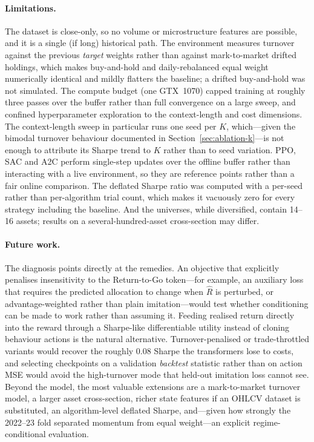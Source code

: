 \documentclass[11pt]{article}
\begin{document}
\paragraph{Limitations.}
The dataset is close-only, so no volume or microstructure features are possible, and it is a
single (if long) historical path. The environment measures turnover against the previous
\emph{target} weights rather than against mark-to-market drifted holdings, which makes
buy-and-hold and daily-rebalanced equal weight numerically identical and mildly flatters the
baseline; a drifted buy-and-hold was not simulated. The compute budget (one GTX~1070) capped
training at roughly three passes over the buffer rather than full convergence on a large
sweep, and confined hyperparameter exploration to the context-length and cost dimensions.
The context-length sweep in particular runs one seed per $K$, which---given the bimodal turnover
behaviour documented in Section~\ref{sec:ablation-k}---is not enough to attribute its Sharpe
trend to $K$ rather than to seed variation.
PPO, SAC and A2C perform single-step updates over the offline buffer rather than interacting
with a live environment, so they are reference points rather than a fair online comparison.
The deflated Sharpe ratio was computed with a per-seed rather than per-algorithm trial count,
which makes it vacuously zero for every strategy including the baseline. And the universes,
while diversified, contain 14--16 assets; results on a several-hundred-asset cross-section may
differ.

\paragraph{Future work.}
The diagnosis points directly at the remedies. An objective that explicitly penalises
insensitivity to the Return-to-Go token---for example, an auxiliary loss that requires the
predicted allocation to change when $\hat{R}$ is perturbed, or advantage-weighted rather than
plain imitation---would test whether conditioning can be made to work rather than assuming it.
Feeding realised return directly into the reward through a Sharpe-like differentiable utility
\cite{moody2001learning,kisiel2022portfolio} instead of cloning behaviour actions is
the natural alternative.
Turnover-penalised or trade-throttled variants would recover the roughly $0.08$ Sharpe the
transformers lose to costs, and selecting checkpoints on a validation \emph{backtest}
statistic rather than on action MSE would avoid the high-turnover mode that held-out imitation
loss cannot see. Beyond the model, the most valuable extensions are a
mark-to-market turnover model, a larger asset cross-section, richer state features if an
OHLCV dataset is substituted, an algorithm-level deflated Sharpe, and---given how strongly the
2022--23 fold separated momentum from equal weight---an explicit regime-conditional evaluation.



\end{document}
